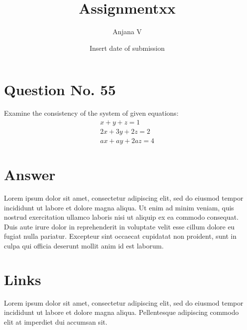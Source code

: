 \documentclass{article}
\title{Assignmentxx}
\author{Anjana V }
\date{Insert date of submission}
\begin{document}
\newcommand{\myvec}[1]{\ensuremath{\begin{pmatrix}#1\end{pmatrix}}}
\renewcommand{\vec}[1]{\mathbf{#1}}
\maketitle
\section{Question No. 55}
Examine the consistency of the system of given equations:
\begin{align}
\label{eqn1}
x+y+z = 1
\\2x+3y+2z = 2
\\ax+ay+2az = 4
\end{align}
\section{Answer}
Lorem ipsum dolor sit amet, consectetur adipiscing elit, sed do eiusmod tempor incididunt ut labore et dolore magna aliqua. Ut enim ad minim veniam, quis nostrud exercitation ullamco laboris nisi ut aliquip ex ea commodo consequat. Duis aute irure dolor in reprehenderit in voluptate velit esse cillum dolore eu fugiat nulla pariatur. Excepteur sint occaecat cupidatat non proident, sunt in culpa qui officia deserunt mollit anim id est laborum.
\section*{Links}
Lorem ipsum dolor sit amet, consectetur adipiscing elit, sed do eiusmod tempor incididunt ut labore et dolore magna aliqua. Pellentesque adipiscing commodo elit at imperdiet dui accumsan sit.
\end{document}
